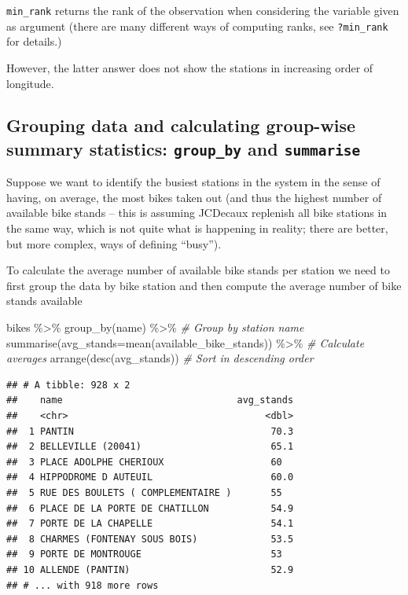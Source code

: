 \documentclass[
]{book}
\newenvironment{Shaded}{\begin{snugshade}}{\end{snugshade}}
\newcommand{\AttributeTok}[1]{\textcolor[rgb]{0.77,0.63,0.00}{#1}}
\newcommand{\CommentTok}[1]{\textcolor[rgb]{0.56,0.35,0.01}{\textit{#1}}}
\newcommand{\FunctionTok}[1]{\textcolor[rgb]{0.00,0.00,0.00}{#1}}
\newcommand{\NormalTok}[1]{#1}
\newcommand{\SpecialCharTok}[1]{\textcolor[rgb]{0.00,0.00,0.00}{#1}}
\begin{document}
\texttt{min\_rank} returns the rank of the observation when considering the variable given as argument (there are many different ways of computing ranks, see \texttt{?min\_rank} for details.)

However, the latter answer does not show the stations in increasing order of longitude.

\hypertarget{grouping-data-and-calculating-group-wise-summary-statistics-group_by-and-summarise}{%
\subsection{\texorpdfstring{Grouping data and calculating group-wise summary statistics: \texttt{group\_by} and \texttt{summarise}}{Grouping data and calculating group-wise summary statistics: group\_by and summarise}}\label{grouping-data-and-calculating-group-wise-summary-statistics-group_by-and-summarise}}

Suppose we want to identify the busiest stations in the system in the sense of having, on average, the most bikes taken out (and thus the highest number of available bike stands -- this is assuming JCDecaux replenish all bike stations in the same way, which is not quite what is happening in reality; there are better, but more complex, ways of defining ``busy'').

To calculate the average number of available bike stands per station we need to first group the data by bike station and then compute the average number of bike stands available

\begin{Shaded}
\begin{Highlighting}[]
\NormalTok{bikes }\SpecialCharTok{\%\textgreater{}\%} \FunctionTok{group\_by}\NormalTok{(name) }\SpecialCharTok{\%\textgreater{}\%}                             \CommentTok{\# Group by station name}
  \FunctionTok{summarise}\NormalTok{(}\AttributeTok{avg\_stands=}\FunctionTok{mean}\NormalTok{(available\_bike\_stands)) }\SpecialCharTok{\%\textgreater{}\%}  \CommentTok{\# Calculate averages}
  \FunctionTok{arrange}\NormalTok{(}\FunctionTok{desc}\NormalTok{(avg\_stands))                              }\CommentTok{\# Sort in descending order}
\end{Highlighting}
\end{Shaded}

\begin{verbatim}
## # A tibble: 928 x 2
##    name                               avg_stands
##    <chr>                                   <dbl>
##  1 PANTIN                                   70.3
##  2 BELLEVILLE (20041)                       65.1
##  3 PLACE ADOLPHE CHERIOUX                   60  
##  4 HIPPODROME D AUTEUIL                     60.0
##  5 RUE DES BOULETS ( COMPLEMENTAIRE )       55  
##  6 PLACE DE LA PORTE DE CHATILLON           54.9
##  7 PORTE DE LA CHAPELLE                     54.1
##  8 CHARMES (FONTENAY SOUS BOIS)             53.5
##  9 PORTE DE MONTROUGE                       53  
## 10 ALLENDE (PANTIN)                         52.9
## # ... with 918 more rows
\end{verbatim}
\end{document}
